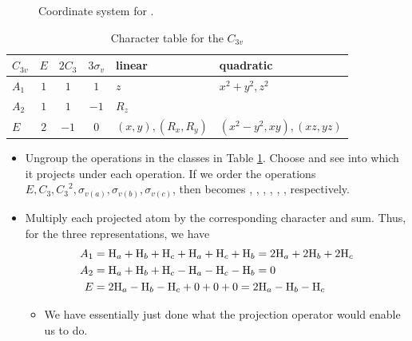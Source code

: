 \documentclass[../notes.tex]{subfiles}
\begin{document}
\begin{itemize}
\begin{figure}[H]
        \caption{Coordinate system for .}
        \label{fig:coordinates-NH3}
    \end{figure}
    \begin{table}[h!]
        \centering
        \small
        \renewcommand{\arraystretch}{1.2}
        \begin{tabular}{l|ccc|l|l}
            $C_{3v}$ & $E$ & $2C_3$ & $3\sigma_v$ & linear & quadratic\\
            \hline
            $A_1$ & $1$ & $1$ & $1$ & $z$ & $x^2+y^2,z^2$\\
            $A_2$ & $1$ & $1$ & $-1$ & $R_z$ & \\
            $E$ & $2$ & $-1$ & $0$ & $(x,y),(R_x,R_y)$ & $(x^2-y^2,xy),(xz,yz)$\\
        \end{tabular}
        \caption{Character table for the $C_{3v}$}
        \label{tab:characterTable-C3v}
    \end{table}
    \begin{itemize}
        \item Ungroup the operations in the classes in Table \ref{tab:characterTable-C3v}. Choose  and see into which  it projects under each operation. If we order the operations $E,C_3,{C_3}^2,\sigma_{v(a)},\sigma_{v(b)},\sigma_{v(c)}$, then  becomes , , , , , , respectively.
        \item Multiply each projected atom by the corresponding character and sum. Thus, for the three representations, we have
        \begin{align*}
            A_1 &= \ce{H_{$a$}}+\ce{H_{$b$}}+\ce{H_{$c$}}+\ce{H_{$a$}}+\ce{H_{$c$}}+\ce{H_{$b$}} = 2\ce{H_{$a$}}+2\ce{H_{$b$}}+2\ce{H_{$c$}}\\
            A_2 &= \ce{H_{$a$}}+\ce{H_{$b$}}+\ce{H_{$c$}}-\ce{H_{$a$}}-\ce{H_{$c$}}-\ce{H_{$b$}} = 0\\
            E &= 2\ce{H_{$a$}}-\ce{H_{$b$}}-\ce{H_{$c$}}+0+0+0 = 2\ce{H_{$a$}}-\ce{H_{$b$}}-\ce{H_{$c$}}
        \end{align*}
        \begin{itemize}
            \item We have essentially just done what the projection operator would enable us to do.

\end{itemize}
\end{itemize}
\end{itemize}
\end{document}

